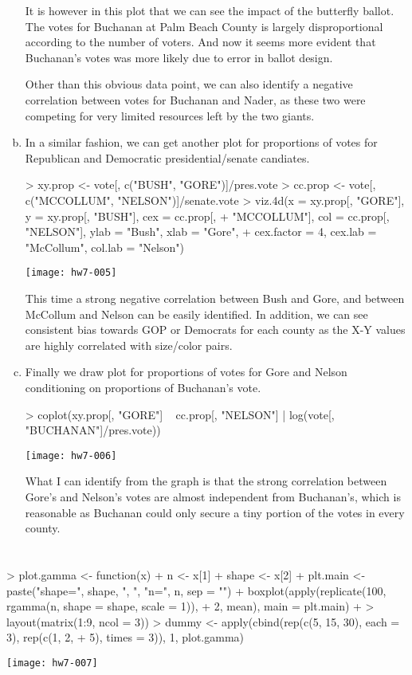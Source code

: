 \documentclass{article}
\begin{document}
\begin{enumerate}[(a)]
    It is however in this plot that we can see the impact of the butterfly ballot. The votes for Buchanan at Palm Beach County is largely disproportional according to the number of voters. And now it seems more evident that Buchanan's votes was more likely due to error in ballot design.

    Other than this obvious data point, we can also identify a negative correlation between votes for Buchanan and Nader, as these two were competing for very limited resources left by the two giants.

    \item In a similar fashion, we can get another plot for proportions of votes for Republican and Democratic presidential/senate candiates.
\begin{Schunk}
\begin{Sinput}
> xy.prop <- vote[, c("BUSH", "GORE")]/pres.vote
> cc.prop <- vote[, c("MCCOLLUM", "NELSON")]/senate.vote
> viz.4d(x = xy.prop[, "GORE"], y = xy.prop[, "BUSH"], cex = cc.prop[, 
+     "MCCOLLUM"], col = cc.prop[, "NELSON"], ylab = "Bush", xlab = "Gore", 
+     cex.factor = 4, cex.lab = "McCollum", col.lab = "Nelson")
\end{Sinput}
\end{Schunk}
\texttt{[image: hw7-005]}

    This time a strong negative correlation between Bush and Gore, and between McCollum and Nelson can be easily identified. 
    In addition, we can see consistent bias towards GOP or Democrats for each county as the X-Y values are highly correlated with size/color pairs. 

    \item Finally we draw plot for proportions of votes for Gore and Nelson conditioning on proportions of Buchanan's vote.
\begin{Schunk}
\begin{Sinput}
> coplot(xy.prop[, "GORE"] ~ cc.prop[, "NELSON"] | log(vote[, "BUCHANAN"]/pres.vote))
\end{Sinput}
\end{Schunk}
\texttt{[image: hw7-006]}

    What I can identify from the graph is that the strong correlation between Gore's and Nelson's votes are almost independent from Buchanan's, which is reasonable as Buchanan could only secure a tiny portion of the votes in every county.
\end{enumerate}
\section{}
\begin{Schunk}
\begin{Sinput}
> plot.gamma <- function(x) {
+     n <- x[1]
+     shape <- x[2]
+     plt.main <- paste("shape=", shape, ", ", "n=", n, sep = "")
+     boxplot(apply(replicate(100, rgamma(n, shape = shape, scale = 1)), 
+         2, mean), main = plt.main)
+ }
> layout(matrix(1:9, ncol = 3))
> dummy <- apply(cbind(rep(c(5, 15, 30), each = 3), rep(c(1, 2, 
+     5), times = 3)), 1, plot.gamma)
\end{Sinput}
\end{Schunk}
\texttt{[image: hw7-007]}
\end{document}
